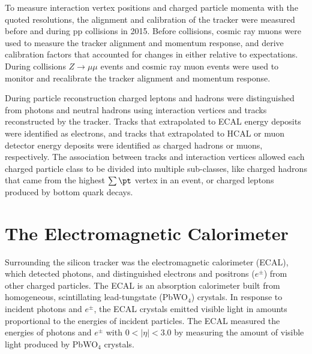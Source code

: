 
To measure interaction vertex positions and charged particle momenta with the quoted resolutions, the alignment and calibration 
of the tracker were measured before and during pp collisions in 2015.  Before collisions, cosmic ray muons were 
used to measure the tracker alignment and momentum response, and derive calibration factors that accounted for 
changes in either relative to expectations.  During collisions $Z \rightarrow \mu\mu$ events and cosmic ray muon events 
were used to monitor and recalibrate the tracker alignment and momentum response.

During particle reconstruction charged leptons and hadrons were distinguished from photons and neutral hadrons using 
interaction vertices and tracks reconstructed by the tracker.  Tracks that extrapolated to ECAL energy deposits were 
identified as electrons, and tracks that extrapolated to HCAL or muon detector energy deposits were identified as charged 
hadrons or muons, respectively.  The association between tracks and interaction vertices allowed each charged particle class 
to be divided into multiple sub-classes, like charged hadrons that came from the highest $\sum \pt$ vertex in an event, 
or charged leptons produced by bottom quark decays.


\section{The Electromagnetic Calorimeter}
\label{sec:ecalDescription}
Surrounding the silicon tracker was the electromagnetic calorimeter (ECAL), which detected photons, and distinguished
electrons and positrons ($e^{\pm}$) from other charged particles.  
The ECAL is an absorption calorimeter built from homogeneous, scintillating lead-tungstate (PbWO$_{4}$) crystals.  
In response to incident photons and $e^{\pm}$, the ECAL crystals emitted visible light in amounts proportional to 
the energies of incident particles.  The ECAL measured the energies of photons and $e^{\pm}$ with $0 < |\eta| < 3.0$ by 
measuring the amount of visible light produced by PbWO$_{4}$ crystals.

